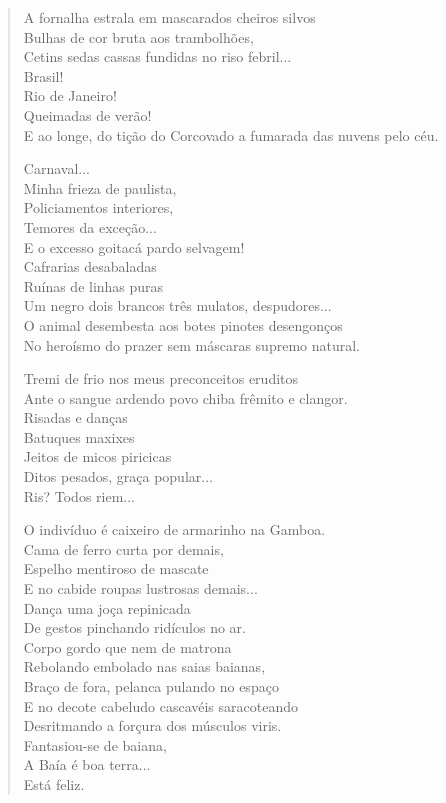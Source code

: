\begin{verse}
A fornalha estrala em mascarados cheiros silvos\\
Bulhas de cor bruta aos trambolhões,\\
Cetins sedas cassas fundidas no riso febril...\\
Brasil!\\
Rio de Janeiro!\\
Queimadas de verão!\\
E ao longe, do tição do Corcovado a fumarada das nuvens pelo céu.

Carnaval...\\
Minha frieza de paulista,\\
Policiamentos interiores,\\
Temores da exceção...\\
E o excesso goitacá pardo selvagem!\\
Cafrarias desabaladas\\
Ruínas de linhas puras\\
Um negro dois brancos três mulatos, despudores...\\
O animal desembesta aos botes pinotes desengonços\\
No heroísmo do prazer sem máscaras supremo natural.

Tremi de frio nos meus preconceitos eruditos\\
Ante o sangue ardendo povo chiba frêmito e clangor.\\
Risadas e danças\\
Batuques maxixes\\
Jeitos de micos piricicas\\
Ditos pesados, graça popular...\\
Ris? Todos riem...

O indivíduo é caixeiro de armarinho na Gamboa.\\
Cama de ferro curta por demais,\\
Espelho mentiroso de mascate\\
E no cabide roupas lustrosas demais...\\
Dança uma joça repinicada\\
De gestos pinchando ridículos no ar.\\
Corpo gordo que nem de matrona\\
Rebolando embolado nas saias baianas,\\
Braço de fora, pelanca pulando no espaço\\
E no decote cabeludo cascavéis saracoteando\\
Desritmando a forçura dos músculos viris.\\
Fantasiou-se de baiana,\\
\quad\quad\quad{}A Baía é boa terra...\\
\quad\quad\quad\quad\quad{}Está feliz.


\end{verse}
